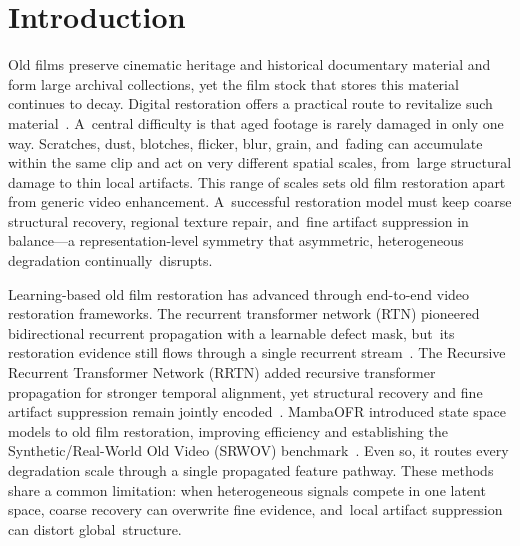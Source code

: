 \documentclass[symmetry,article,accept,pdftex,moreauthors]{Definitions/mdpi}
\begin{document}
%
\section{Introduction}
\label{sec:introduction}

Old films preserve cinematic heritage and historical documentary material and form large archival collections, yet the film stock that stores this material continues to decay. Digital restoration offers a practical route to revitalize such material~\cite{iizuka2019deepremaster}. A~central difficulty is that aged footage is rarely damaged in only one way. Scratches, dust, blotches, flicker, blur, grain, and~fading can accumulate within the same clip and act on very different spatial scales, from~large structural damage to thin local artifacts. This range of scales sets old film restoration apart from generic video enhancement. A~successful restoration model must keep coarse structural recovery, regional texture repair, and~fine artifact suppression in balance---a representation-level symmetry that asymmetric, heterogeneous degradation continually~disrupts.

Learning-based old film restoration has advanced through end-to-end video restoration frameworks. The recurrent transformer network (RTN) pioneered bidirectional recurrent propagation with a learnable defect mask, but~its restoration evidence still flows through a single recurrent stream~\cite{wan2022rtn}. The Recursive Recurrent Transformer Network (RRTN) added recursive transformer propagation for stronger temporal alignment, yet structural recovery and fine artifact suppression remain jointly encoded~\cite{lin2024rrtn}. MambaOFR introduced state space models to old film restoration, improving efficiency and establishing the Synthetic/Real-World Old Video (SRWOV) benchmark~\cite{mao2025mambaofr,gu2024mamba,guo2024mambair}. Even so, it routes every degradation scale through a single propagated feature pathway. These methods share a common limitation: when heterogeneous signals compete in one latent space, coarse recovery can overwrite fine evidence, and~local artifact suppression can distort global~structure.
\end{document}
